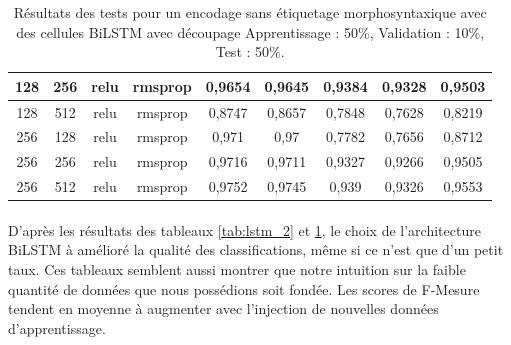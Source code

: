 \begin{table}[H]
{\begin{tabular}{|c|c|c|c|c|c|c|c|c|}
				128 & 256 & relu & rmsprop & 0,9654 & 0,9645 & 0,9384 & 0,9328 & 0,9503 \\ \hline
				128 & 512 & relu & rmsprop & 0,8747 & 0,8657 & 0,7848 & 0,7628 & 0,8219 \\ \hline
				256 & 128 & relu & rmsprop & 0,971 & 0,97 & 0,7782 & 0,7656 & 0,8712 \\ \hline
				256 & 256 & relu & rmsprop & 0,9716 & 0,9711 & 0,9327 & 0,9266 & 0,9505 \\ \hline
				256 & 512 & relu & rmsprop & 0,9752 & 0,9745 & 0,939 & 0,9326 & 0,9553 \\ \hline
			\end{tabular}%
		}
		\caption{Résultats des tests pour un encodage sans étiquetage morphosyntaxique avec des cellules BiLSTM avec découpage Apprentissage : 50\%, Validation : 10\%, Test : 50\%.}
		\label{tab:bilstm_2}
	\end{table}
	
	
	\paragraph{}
	D'après les résultats des tableaux \ref{tab:lstm_2} et \ref{tab:bilstm_2}, le choix de l'architecture BiLSTM à amélioré la qualité des classifications, même si ce n'est que d'un petit taux. Ces tableaux semblent aussi montrer que notre intuition sur la faible quantité de données que nous possédions soit fondée. Les scores de F-Mesure tendent en moyenne à augmenter avec l'injection de nouvelles données d'apprentissage.
	
